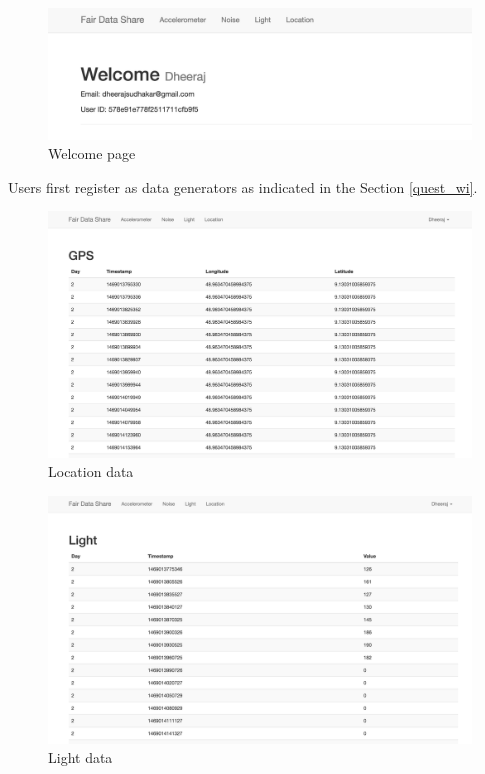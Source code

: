 \begin{figure}[ht!]
\centering
\includegraphics[width=\textwidth,keepaspectratio]{./images/fds_user_welcome}
\caption{Welcome page\label{fig:fdsdash}}
\end{figure}

Users first register as data generators as indicated in the Section \ref{quest_wi}.

\begin{figure}[ht!]
\centering
\includegraphics[width=\textwidth,keepaspectratio]{./images/fds_user_gps_full}
\caption{Location data\label{fig:fdsgps}}
\end{figure}

\begin{figure}[ht!]
\centering
\includegraphics[width=\textwidth,keepaspectratio]{./images/fds_user_light_full}
\caption{Light data \label{fig:fdslight}}
\end{figure}


